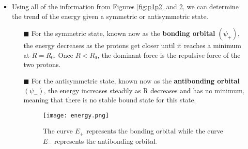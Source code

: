 \documentclass[12pt, letterpaper, twoside]{article}
\begin{document}
\begin{itemize}
\begin{figure}[!ht]
\begin{subfigure}{0.48\textwidth}
        \end{subfigure}%
        \hspace{0.2cm}
        \begin{subfigure}{0.48\textwidth}
            \centering
            \texttt{[image: p1p2 2.png]}
            \caption{This figure explains the effect of Figure \ref{fig:p1p2}, showing that the density of electrons at the origin (maximum overlap) is zero for an antisymmetric state (bottom), whereas it is enhanced in the symmetric state (top).}
            \label{fig:p1p2 2}
        \end{subfigure}    
    \end{figure}
    \item Using all of the information from Figures \ref{fig:p1p2} and \ref{fig:p1p2 2}, we can determine the trend of the energy given a symmetric or antisymmetric state. 
    \begin{itemize}
        \item[$\blacksquare$] For the symmetric state, known now as the \textbf{bonding orbital} $(\psi_+)$, the energy decreases as the protons get closer until it reaches a minimum at $R = R_0$. Once $R < R_0$, the dominant force is the repulsive force of the two protons.
        \item[$\blacksquare$] For the antisymmetric state, known now as the \textbf{antibonding orbital} $(\psi_-)$, the energy increases steadily as R decreases and has no minimum, meaning that there is no stable bound state for this state.
        \begin{figure}[!ht]
            \centering
            \texttt{[image: energy.png]}
            \caption{The curve $E_+$ represents the bonding orbital while the curve $E_-$ represents the antibonding orbital.}
            \label{fig:my_label}
        \end{figure}
    \end{itemize}
\end{itemize}
\end{document}
